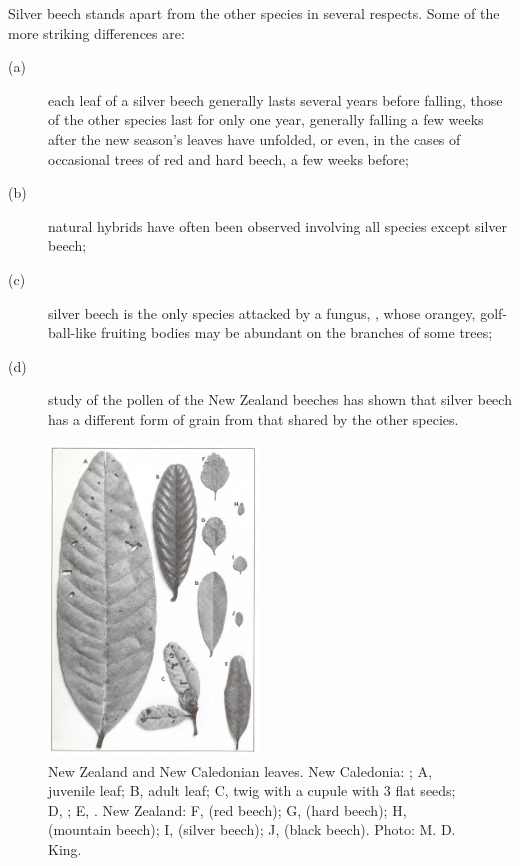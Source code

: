 Silver beech stands apart from the other species in several respects.
Some of the more striking differences are:

\begin{description}
\item[{(a)}]each leaf of a silver beech generally lasts several years before falling, those of the other species last for only one year, generally falling a few weeks after the new season's leaves have unfolded, or even, in the cases of occasional trees of red and hard beech, a few weeks before;
\item[{(b)}]natural hybrids have often been observed involving all species except silver beech;
\item[{(c)}]silver beech is the only species attacked by a fungus, , whose orangey, golf-ball-like fruiting bodies may be abundant on the branches of some trees;
\item[{(d)}]study of the pollen of the New Zealand beeches has shown that silver beech has a different form of grain from that shared by the other species.
\end{description}

\begin{figure}
	\includegraphics[width=0.5\textwidth]{graphics/figure70nothofagus.jpg}
	\centering
	\caption[New Zealand and New Caledonian Nothofagus leaves]{New Zealand and New Caledonian  leaves.
New Caledonia: ; A, juvenile leaf; B, adult leaf; C, twig with a cupule with 3 flat seeds; D, ; E, .
New Zealand: F,  (red beech); G,  (hard beech); H,  (mountain beech); I,  (silver beech); J,  (black beech).
	Photo: M. D. King.}
	\label{fig:70nothofagus}
\end{figure}

